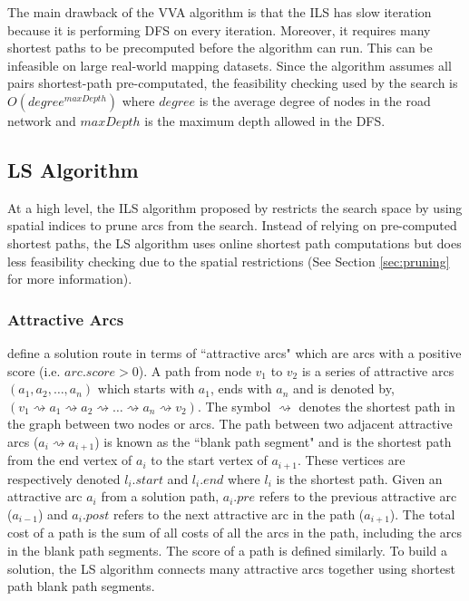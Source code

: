 \documentclass[honors]{union-cs-thesis}
\newcommand{\spa}{\rightsquigarrow}
\newcommand{\td}{\todo[inline]}
\begin{document}
The main drawback of the VVA algorithm is that the ILS has slow iteration because it is performing DFS on every iteration.  Moreover, it requires many shortest paths to be precomputed before the algorithm can run. This can be infeasible on large real-world  mapping datasets. Since the algorithm assumes all pairs shortest-path pre-computated, the feasibility checking used by the search is $O(degree^{maxDepth})$ where $degree$ is the average degree of nodes in the road network and $maxDepth$ is the maximum depth allowed in the DFS.

\subsection{LS Algorithm}
At a high level, the ILS algorithm proposed by \citeauthor{lu2015arc} restricts the search space by using spatial indices to prune arcs from the search. Instead of relying on pre-computed shortest paths, the LS algorithm uses online shortest path computations but does less feasibility checking due to the spatial restrictions (See Section \ref{sec:pruning} for more information).

\subsubsection{Attractive Arcs}
\citeauthor{lu2015arc} define a solution route in terms of ``attractive arcs" which are arcs with a positive score (i.e. $arc.score > 0$). A path from node $v_1$ to $v_2$ is a series of attractive arcs $(a_1, a_2, \ldots, a_n)$ which starts with $a_1$, ends with $a_n$ and is denoted by, $(v_1 \spa a_1 \spa a_2 \spa \ldots \spa a_n \spa v_2)$. The symbol $\spa$ denotes the shortest path in the graph between two nodes or arcs. The path between two adjacent attractive arcs ($a_i \spa  a_{i+1}$) is known as the ``blank path segment" and is the shortest path from the end vertex of $a_i$ to the start vertex of $a_{i+1}$. These vertices are respectively denoted $l_i.start$ and $l_i.end$ where $l_i$ is the shortest path. Given an attractive arc $a_i$ from a solution path, $a_i.pre$ refers to the previous attractive arc ($a_{i-1}$) and $a_i.post$ refers to the next attractive arc in the path ($a_{i+1}$). The total cost of a path is the sum of all costs of all the arcs in the path, including the arcs in the blank path segments. The score of a path is defined similarly. To build a solution, the LS algorithm connects many attractive arcs together using shortest path blank path segments.
\end{document}
